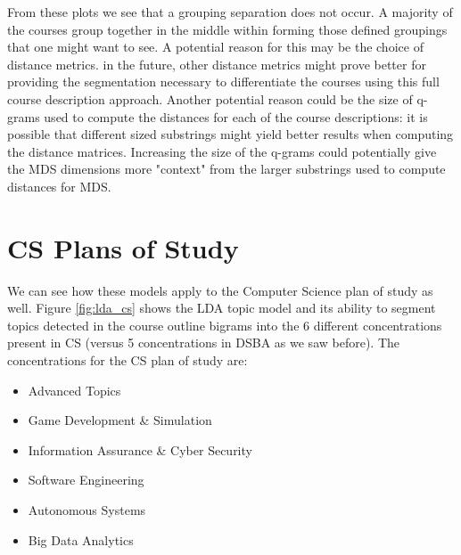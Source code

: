 From these plots we see that a grouping separation does not occur.  A majority of the courses group together in the middle within forming those defined 
groupings that one might want to see. A potential reason for this may be the choice of distance metrics. in the future, other distance metrics might prove 
better for providing the segmentation necessary to differentiate the courses using this full course description approach.  Another potential reason could be 
the size of q-grams used to compute the distances for each of the course descriptions: it is possible that different sized substrings might yield better results 
when computing the distance matrices. Increasing the size of the q-grams could potentially give the MDS dimensions more "context" from the larger substrings 
used to compute distances for MDS. 





\section{CS Plans of Study}

We can see how these models apply to the Computer Science plan of study as well. Figure \ref{fig:lda_cs} shows the LDA topic 
model and its ability to segment topics detected in the course outline bigrams into the 6 different concentrations present in CS (versus 5 concentrations in 
DSBA as we saw before). 
The concentrations for the CS plan of study are: 

\begin{itemize}
  \item Advanced Topics  
  \item Game Development \& Simulation  
  \item Information Assurance \& Cyber Security  
  \item Software Engineering   
  \item Autonomous Systems  
  \item Big Data Analytics  
\end{itemize}

